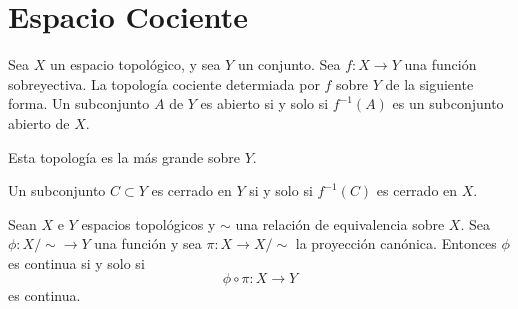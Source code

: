 \documentclass{./Topologia.tex}
\begin{document}
\chapter{Espacio Cociente}
\begin{defin}
    Sea \(X\) un espacio topológico, y sea \(Y\) un conjunto. Sea \(f:X \to Y\) una función
    sobreyectiva. La topología cociente determiada por \(f\) sobre \(Y\) de la siguiente forma.
    Un subconjunto \(A\) de \(Y\) es abierto si y solo si \(f^{-1}(A)\) es un subconjunto
    abierto de \(X\).
\end{defin}
Esta topología es la más grande sobre \(Y\).
\begin{prop}
    Un subconjunto \(C \subset Y\) es cerrado en \(Y\) si y solo si \(f^{-1}(C)\) es cerrado
    en \(X\).
\end{prop}
\begin{teorema}
    Sean \(X\) e \(Y\) espacios topológicos y \(\sim\) una relación de equivalencia sobre
    \(X\). Sea \(\phi :X / \sim \to Y\) una función y sea \(\pi: X \to  X / \sim\) la
    proyección canónica. Entonces \(\phi \) es continua si y solo si
    \[
        \phi \circ \pi: X \to Y
    \]
    es continua.
\end{teorema}
\end{document}
